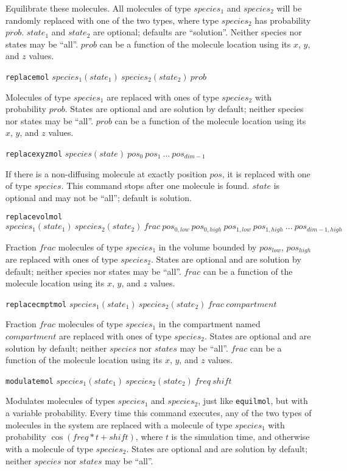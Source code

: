 \documentclass {scrbook}
\newcommand {\ttt} {\texttt}
\begin{document}
\begin{description}
Equilibrate these molecules. All molecules of type $species_1$ and $species_2$ will be randomly replaced with one of the two types, where type $species_2$ has probability $prob$. $state_1$ and $state_2$ are optional; defaults are ``solution''. Neither species nor states may be ``all''. $prob$ can be a function of the molecule location using its $x$, $y$, and $z$ values.

\item{\ttt{replacemol} $species_1(state_1)\ species_2(state_2)\ prob$}

Molecules of type $species_1$ are replaced with ones of type $species_2$ with probability $prob$. States are optional and are solution by default; neither species nor states may be ``all''. $prob$ can be a function of the molecule location using its $x$, $y$, and $z$ values.

\item{\ttt{replacexyzmol} $species(state)\ pos_0\ pos_1\ ...\ pos_{dim-1}$}

If there is a non-diffusing molecule at exactly position $pos$, it is replaced with one of type $species$. This command stops after one molecule is found. $state$ is optional and may not be ``all''; default is solution.

\item{\ttt{replacevolmol} $species_1(state_1)\ species_2(state_2)\ frac\ pos_{0,low}\ pos_{0,high}\ pos_{1,low}\ pos_{1,high}\ ...\ pos_{dim-1,high}$}

Fraction $frac$ molecules of type $species_1$ in the volume bounded by $pos_{low}$, $pos_{high}$ are replaced with ones of type $species_2$. States are optional and are solution by default; neither species nor states may be ``all''. $frac$ can be a function of the molecule location using its $x$, $y$, and $z$ values.

\item{\ttt{replacecmptmol} $species_1(state_1)\ species_2(state_2)\ frac\ compartment$}

Fraction $frac$ molecules of type $species_1$ in the compartment named $compartment$ are replaced with ones of type $species_2$. States are optional and are solution by default; neither $species$ nor $states$ may be ``all''. $frac$ can be a function of the molecule location using its $x$, $y$, and $z$ values.

\item{\ttt{modulatemol} $species_1(state_1)\ species_2(state_2)\ freq\ shift$}

Modulates molecules of types $species_1$ and $species_2$, just like \ttt{equilmol}, but with a variable probability. Every time this command executes, any of the two types of molecules in the system are replaced with a molecule of type $species_1$ with probability $\cos(freq*t+shift)$, where $t$ is the simulation time, and otherwise with a molecule of type $species_2$. States are optional and are solution by default; neither $species$ nor $states$ may be ``all''.


\end{description}
\end{document}
